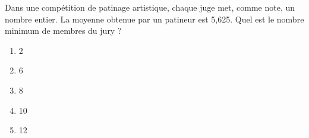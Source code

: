 Dans une compétition de patinage artistique, chaque juge met, comme note, un nombre entier. La moyenne obtenue par un patineur est 5,625. Quel est le nombre minimum de membres du jury ?
\begin{multicols}{5}
  \begin{enumerate}[A/]
  \item 2
  \item 6
  \item 8
  \item 10
  \item 12
  \end{enumerate}
\end{multicols}